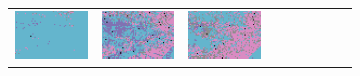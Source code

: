 \documentclass{ipol}
\begin{document}
\begin{figure}[ht]
\begin{subfigure}[t]{\linewidth}
\begin{tabular}{ccccccccc}
                \includegraphics[width=\s]{images/night/LINEAR/bid_j100_64_grids.png}&
                \includegraphics[width=\s]{images/night/PPG/bid_j100_64_grids.png}&
                \includegraphics[width=\s]{images/night/VNG/bid_j100_64_grids.png}\\

\end{tabular}
\end{subfigure}
\end{figure}
\end{document}
